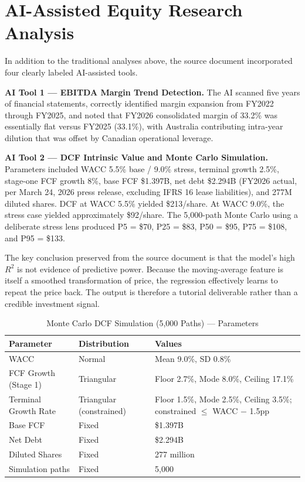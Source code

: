 \documentclass[11pt]{article}
\begin{document}
\clearpage
\section{AI-Assisted Equity Research Analysis}
In addition to the traditional analyses above, the source document incorporated four clearly labeled AI-assisted tools.

\textbf{AI Tool 1 --- EBITDA Margin Trend Detection.} The AI scanned five years of financial statements, correctly identified margin expansion from FY2022 through FY2025, and noted that FY2026 consolidated margin of 33.2\% was essentially flat versus FY2025 (33.1\%), with Australia contributing intra-year dilution that was offset by Canadian operational leverage.

\textbf{AI Tool 2 --- DCF Intrinsic Value and Monte Carlo Simulation.} Parameters included WACC 5.5\% base / 9.0\% stress, terminal growth 2.5\%, stage-one FCF growth 8\%, base FCF \$1.397B, net debt \$2.294B (FY2026 actual, per March 24, 2026 press release, excluding IFRS 16 lease liabilities), and 277M diluted shares. DCF at WACC 5.5\% yielded \$213/share. At WACC 9.0\%, the stress case yielded approximately \$92/share. The 5,000-path Monte Carlo using a deliberate stress lens produced P5 = \$70, P25 = \$83, P50 = \$95, P75 = \$108, and P95 = \$133.

The key conclusion preserved from the source document is that the model's high $R^2$ is not evidence of predictive power. Because the moving-average feature is itself a smoothed transformation of price, the regression effectively learns to repeat the price back. The output is therefore a tutorial deliverable rather than a credible investment signal.


\begin{table}[H]
\centering
\caption{Monte Carlo DCF Simulation (5,000 Paths) --- Parameters}
\renewcommand{\arraystretch}{1.2}
\begin{tabularx}{\linewidth}{Y Y Y}
\toprule
{}
Parameter & Distribution & Values \\
\midrule
WACC & Normal & Mean 9.0\%, SD 0.8\% \\
FCF Growth (Stage 1) & Triangular & Floor 2.7\%, Mode 8.0\%, Ceiling 17.1\% \\
Terminal Growth Rate & Triangular (constrained) & Floor 1.5\%, Mode 2.5\%, Ceiling 3.5\%; constrained $\leq$ WACC $-$ 1.5pp \\
Base FCF & Fixed & \$1.397B \\
Net Debt & Fixed & \$2.294B \\
Diluted Shares & Fixed & 277 million \\
Simulation paths & Fixed & 5,000 \\
\bottomrule
\end{tabularx}
\end{table}
\end{document}
